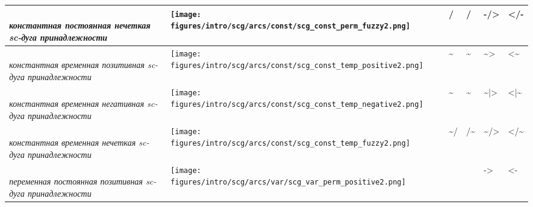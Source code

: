 \begin{SCn}
{\begin{longtable}[l]{|m{4.6cm}|m{3.5cm}|m{2cm}|m{2cm}|m{2cm}|m{2cm}|}
	\parbox[m]{4.6cm}{\textit{\\ константная постоянная нечеткая sc-дуга принадлежности \\}} & \parbox[m]{3.5cm}{\centering\texttt{[image: figures/intro/scg/arcs/const/scg\_const\_perm\_fuzzy2.png]}} & \parbox[m]{2cm}{\centering / \ni} & \parbox[m]{2cm}{\centering \in /} & \parbox[m]{2cm}{\centering -/>} & \parbox[m]{2cm}{\centering </-} \\
	\hline
	
	\parbox[m]{4.6cm}{\textit{\\ константная временная позитивная sc-дуга принадлежности \\}} & \parbox[m]{3.5cm}{\centering \texttt{[image: figures/intro/scg/arcs/const/scg\_const\_temp\_positive2.png]}} & \parbox[m]{2cm}{\centering \sim \ni} & \parbox[m]{2cm}{\centering \in \sim} & \parbox[m]{2cm}{\centering \sim>} & \parbox[m]{2cm}{\centering <\sim} \\
	\hline
	
	\parbox[m]{4.6cm}{\textit{\\ константная временная негативная sc-дуга принадлежности \\}} & \parbox[m]{3.5cm}{\centering \texttt{[image: figures/intro/scg/arcs/const/scg\_const\_temp\_negative2.png]}} & \parbox[m]{2cm}{\centering \sim \not\ni} & \parbox[m]{2cm}{\centering \notin \sim} & \parbox[m]{2cm}{\centering \sim|>} & \parbox[m]{2cm}{\centering <|\sim} \\
	\hline
	
	\parbox[m]{4.6cm}{\textit{\\ константная временная нечеткая sc-дуга принадлежности \\}} & \parbox[m]{3.5cm}{\centering \texttt{[image: figures/intro/scg/arcs/const/scg\_const\_temp\_fuzzy2.png]}} & \parbox[m]{2cm}{\centering \sim / \ni}  & \parbox[m]{2cm}{\centering \in/\sim} & \parbox[m]{2cm}{\centering \sim/>} & \parbox[m]{2cm}{\centering </\sim} \\
	\hline
	
	\parbox[m]{4.6cm}{\textit{\\ переменная постоянная позитивная sc-дуга принадлежности \\}} & \parbox[m]{3.5cm}{\centering \texttt{[image: figures/intro/scg/arcs/var/scg\_var\_perm\_positive2.png]}} & \parbox[m]{2cm}{\centering \textunderscore \ni} & \parbox[m]{2cm}{\centering \textunderscore \in} & \parbox[m]{2cm}{\centering \textunderscore->} & \parbox[m]{2cm}{\centering <-\textunderscore} \\
	\hline
	

\end{longtable}}
\end{SCn}
